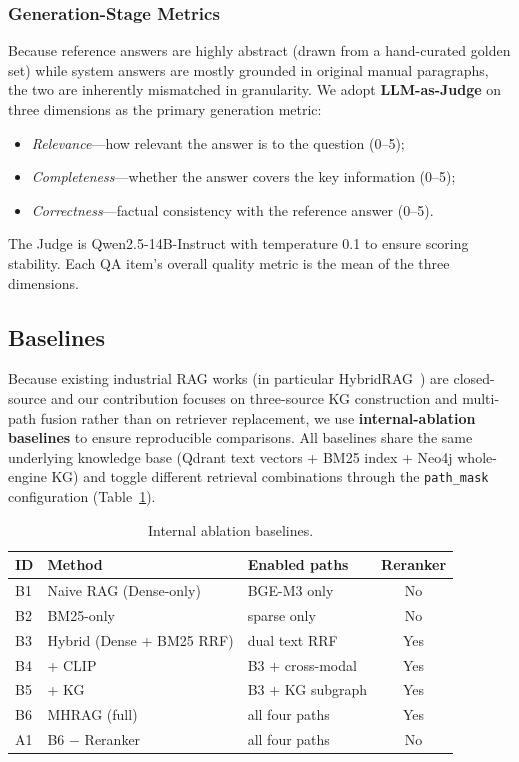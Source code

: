\documentclass[applsci,article,submit,pdftex,moreauthors]{Definitions/mdpi}
\begin{document}
\subsubsection{Generation-Stage Metrics}

Because reference answers are highly abstract (drawn from a hand-curated golden set) while system answers are mostly grounded in original manual paragraphs, the two are inherently mismatched in granularity. We adopt \textbf{LLM-as-Judge} on three dimensions as the primary generation metric:
\begin{itemize}
\item \emph{Relevance}---how relevant the answer is to the question (0--5);
\item \emph{Completeness}---whether the answer covers the key information (0--5);
\item \emph{Correctness}---factual consistency with the reference answer (0--5).
\end{itemize}
The Judge is Qwen2.5-14B-Instruct with temperature 0.1 to ensure scoring stability. Each QA item's overall quality metric is the mean of the three dimensions.

\subsection{Baselines}
\label{sec:exp-baselines}

Because existing industrial RAG works (in particular HybridRAG~\citep{shen2025hybridrag}) are closed-source and our contribution focuses on three-source KG construction and multi-path fusion rather than on retriever replacement, we use \textbf{internal-ablation baselines} to ensure reproducible comparisons. All baselines share the same underlying knowledge base (Qdrant text vectors + BM25 index + Neo4j whole-engine KG) and toggle different retrieval combinations through the \texttt{path\_mask} configuration (Table~\ref{tab:baselines}).

\begin{table}[H]
\caption{Internal ablation baselines.\label{tab:baselines}}
\begin{tabularx}{\textwidth}{llXc}
\toprule
\textbf{ID} & \textbf{Method} & \textbf{Enabled paths} & \textbf{Reranker}\\
\midrule
B1 & Naive RAG (Dense-only)        & BGE-M3 only             & No\\
B2 & BM25-only                     & sparse only             & No\\
B3 & Hybrid (Dense + BM25 RRF)     & dual text RRF           & Yes\\
B4 & + CLIP                        & B3 $+$ cross-modal      & Yes\\
B5 & + KG                          & B3 $+$ KG subgraph      & Yes\\
B6 & MHRAG (full)                  & all four paths          & Yes\\
\midrule
A1 & B6 $-$ Reranker               & all four paths          & No\\
\bottomrule
\end{tabularx}
\end{table}
\end{document}

